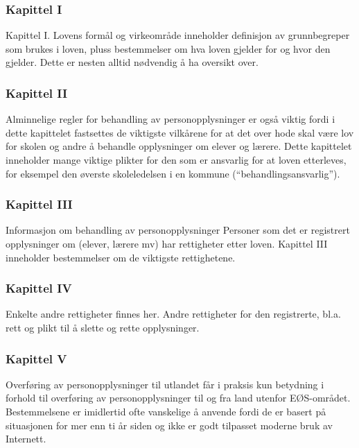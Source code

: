 \documentclass[11pt]{article}
\begin{document}
\subsubsection{Kapittel I}
\label{sec-17.2.1}

    Kapittel I. Lovens formål og virkeområde inneholder definisjon av grunnbegreper 
    som brukes i loven, pluss bestemmelser om hva loven gjelder for og hvor den gjelder. 
    Dette er nesten alltid nødvendig å ha oversikt over.
\subsubsection{Kapittel II}
\label{sec-17.2.2}

    Alminnelige regler for behandling av personopplysninger er også viktig fordi
    i dette kapittelet fastsettes de viktigste vilkårene for at det over hode
    skal være lov for skolen og andre å behandle opplysninger om elever og lærere.
    Dette kapittelet inneholder mange viktige plikter for den som er ansvarlig for
    at loven etterleves, for eksempel den øverste skoleledelsen i en kommune 
    (``behandlingsansvarlig'').
\subsubsection{Kapittel III}
\label{sec-17.2.3}

    Informasjon om behandling av personopplysninger
    Personer som det er registrert opplysninger om (elever, lærere mv) har rettigheter
    etter loven. Kapittel III inneholder bestemmelser om de viktigste rettighetene.
\subsubsection{Kapittel IV}
\label{sec-17.2.4}

    Enkelte andre rettigheter finnes her. Andre rettigheter for den registrerte,
    bl.a. rett og plikt til å slette og rette opplysninger.
\subsubsection{Kapittel V}
\label{sec-17.2.5}

    Overføring av personopplysninger til utlandet får i praksis kun betydning
    i forhold til overføring av personopplysninger til og fra land utenfor EØS-området. 
    Bestemmelsene er imidlertid ofte vanskelige å anvende fordi de er basert på situasjonen
    for mer enn ti år siden og ikke er godt tilpasset moderne bruk av Internett.
\end{document}
